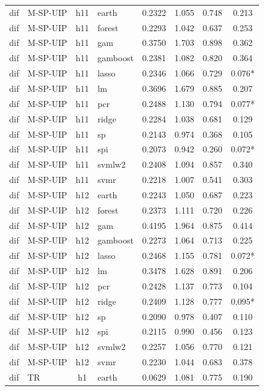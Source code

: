 \begin{ThreePartTable}
\begin{longtable}[t]{llclcccc}
dif & M-SP-UIP & h11 & earth & 0.2322 & 1.055 & 0.748 & 0.213\\
dif & M-SP-UIP & h11 & forest & 0.2293 & 1.042 & 0.637 & 0.253\\
dif & M-SP-UIP & h11 & gam & 0.3750 & 1.703 & 0.898 & 0.362\\
dif & M-SP-UIP & h11 & gamboost & 0.2381 & 1.082 & 0.820 & 0.364\\
dif & M-SP-UIP & h11 & lasso & 0.2346 & 1.066 & 0.729 & 0.076*\\
dif & M-SP-UIP & h11 & lm & 0.3696 & 1.679 & 0.885 & 0.207\\
dif & M-SP-UIP & h11 & pcr & 0.2488 & 1.130 & 0.794 & 0.077*\\
dif & M-SP-UIP & h11 & ridge & 0.2284 & 1.038 & 0.681 & 0.129\\
dif & M-SP-UIP & h11 & sp & 0.2143 & 0.974 & 0.368 & 0.105\\
dif & M-SP-UIP & h11 & spi & 0.2073 & 0.942 & 0.260 & 0.072*\\
dif & M-SP-UIP & h11 & svmlw2 & 0.2408 & 1.094 & 0.857 & 0.340\\
dif & M-SP-UIP & h11 & svmr & 0.2218 & 1.007 & 0.541 & 0.303\\
\addlinespace
dif & M-SP-UIP & h12 & earth & 0.2243 & 1.050 & 0.687 & 0.223\\
dif & M-SP-UIP & h12 & forest & 0.2373 & 1.111 & 0.720 & 0.226\\
dif & M-SP-UIP & h12 & gam & 0.4195 & 1.964 & 0.875 & 0.414\\
dif & M-SP-UIP & h12 & gamboost & 0.2273 & 1.064 & 0.713 & 0.225\\
dif & M-SP-UIP & h12 & lasso & 0.2468 & 1.155 & 0.781 & 0.072*\\
dif & M-SP-UIP & h12 & lm & 0.3478 & 1.628 & 0.891 & 0.206\\
dif & M-SP-UIP & h12 & pcr & 0.2428 & 1.137 & 0.773 & 0.104\\
dif & M-SP-UIP & h12 & ridge & 0.2409 & 1.128 & 0.777 & 0.095*\\
dif & M-SP-UIP & h12 & sp & 0.2090 & 0.978 & 0.407 & 0.110\\
dif & M-SP-UIP & h12 & spi & 0.2115 & 0.990 & 0.456 & 0.123\\
dif & M-SP-UIP & h12 & svmlw2 & 0.2257 & 1.056 & 0.770 & 0.121\\
dif & M-SP-UIP & h12 & svmr & 0.2230 & 1.044 & 0.683 & 0.378\\
\addlinespace
dif & TR & h1 & earth & 0.0629 & 1.081 & 0.775 & 0.190\\

\end{longtable}
\end{ThreePartTable}
